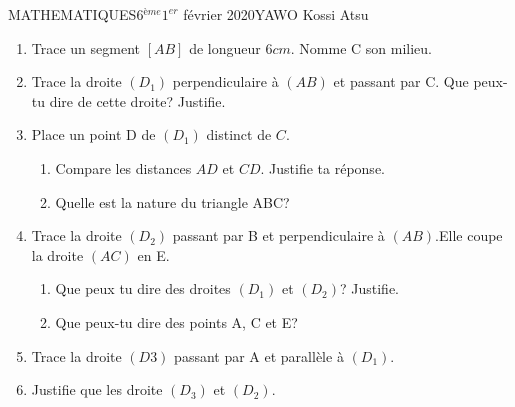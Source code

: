 \documentclass[12pt,a4paper]{book}
\newcommand{\prof}{YAWO Kossi Atsu}
\newcommand{\matiere}{MATHEMATIQUES}
\newcommand{\classe}{6$^{ème}$}
\begin{document}
\newpage
\begin{td}{\matiere}{\classe}{$1^{er}$ février 2020}{\prof}
\begin{exo}
\begin{enumerate}
\item Trace un segment $[AB]$ de longueur $6cm$. Nomme C son milieu.
\item Trace la droite $(D_1)$ perpendiculaire à $(AB)$ et passant par C. Que peux-tu dire de cette droite? Justifie.
\item Place un point D de $(D_1)$ distinct de $C$.
\begin{enumerate}
\item Compare les distances $AD$ et $CD$. Justifie ta réponse.
\item Quelle est la nature du triangle ABC?
\end{enumerate}
\item Trace la droite $(D_2)$ passant par B et perpendiculaire à $(AB)$.Elle coupe la droite $(AC)$ en E.
\begin{enumerate}
\item Que peux tu dire des droites $(D_1)$ et $(D_2)$? Justifie.
\item Que peux-tu dire des points A, C et E?
\end{enumerate} 
\item Trace la droite $(D3)$ passant par A et parallèle à $(D_1)$.
\item Justifie que les droite $(D_3)$ et $(D_2)$.
\end{enumerate} 
\end{exo}
\end{td}

\vspace{3cm}
\end{document}
